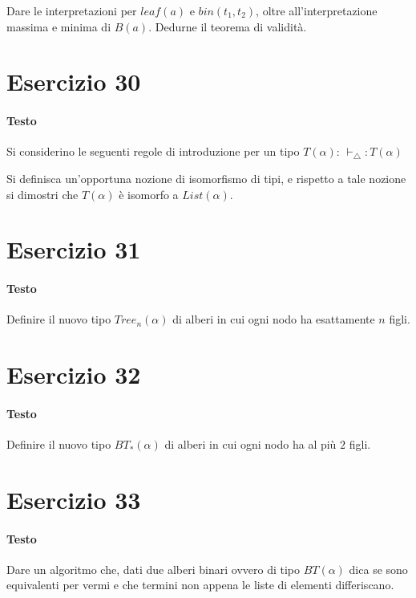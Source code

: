 \documentclass[a4paper,11pt]{article}
\begin{document}
\begin{prooftree}
\end{prooftree}
Dare le interpretazioni per $leaf(a)$ e $bin(t_1, t_2)$, oltre all’interpretazione massima e minima di $B(a)$. Dedurne il teorema di validità.

\section*{Esercizio 30}
\paragraph{Testo}
Si considerino le seguenti regole di introduzione per un tipo $T(\alpha)$:
$\vdash_\triangle : T(\alpha)$

\begin{prooftree}
\end{prooftree}
Si definisca un’opportuna nozione di isomorfismo di tipi, e rispetto a tale nozione si dimostri che $T(\alpha)$ è isomorfo a $List(\alpha)$.

\section*{Esercizio 31}
\paragraph{Testo}
Definire il nuovo tipo $Tree_n(\alpha)$ di alberi in cui ogni nodo ha esattamente $n$ figli.

\section*{Esercizio 32}
\paragraph{Testo}
Definire il nuovo tipo $BT_\ast (\alpha)$ di alberi in cui ogni nodo ha al più $2$ figli.

\section*{Esercizio 33}
\paragraph{Testo}
Dare un algoritmo che, dati due alberi binari ovvero di tipo $BT(\alpha)$ dica se sono equivalenti per vermi e che termini non appena le liste di elementi differiscano.
\end{document}
